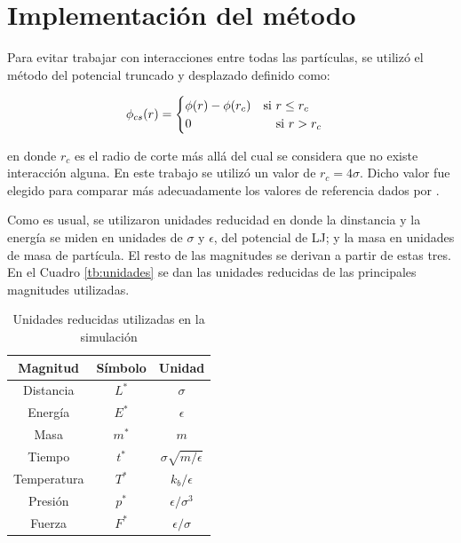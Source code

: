 \documentclass[a4paper,12pt]{article}
\begin{document}
\section{Implementación del método}

Para evitar trabajar con interacciones entre todas las partículas, se utilizó 
el método del potencial truncado y desplazado definido como:

\begin{equation}\label{eq:pot_cs}
  \phi_{cs}(r) = 
  \begin{cases}
	  \phi(r)- \phi(r_c) \quad \text{si } r \leq r_c \\
	  0 \hspace{2.4cm} \text{si } r > r_c
  \end{cases}
\end{equation}

\noindent en donde $r_c$ es el radio de corte más allá del cual se considera 
que no existe interacción alguna. En este trabajo se utilizó un valor de 
$r_c=4\sigma$. Dicho valor fue elegido para comparar más adecuadamente los 
valores de referencia dados por \cite{johnson1993}.

Como es usual, se utilizaron unidades reducidad en donde la dinstancia y la 
energía se miden en unidades de $\sigma$ y $\epsilon$, del potencial de LJ; y 
la masa en unidades de masa de partícula. El resto de las magnitudes se 
derivan a partir de estas tres. En el Cuadro \eqref{tb:unidades} se dan las 
unidades reducidas de las principales magnitudes utilizadas.

\begin{table}
	\begin{center}
		\begin{tabular}{ccc}
			\hline
			{\bf Magnitud} & {\bf Símbolo} & {\bf Unidad} \\ \hline
			Distancia   & $L^*$ & $\sigma$ \\ 
			Energía     & $E^*$ & $\epsilon$ \\ 
			Masa        & $m^*$ & $m$ \\ 
			Tiempo      & $t^*$ & $\sigma\sqrt{m/\epsilon}$ \\ 
			Temperatura & $T^*$ & $k_b/\epsilon$ \\ 
			Presión     & $p^*$ & $\epsilon/\sigma^3$ \\ 
			Fuerza      & $F^*$ & $\epsilon/\sigma$ \\ 
			\hline 
		\end{tabular}
	\end{center} 
	\caption{Unidades reducidas utilizadas en la simulación}
	\label{tb:unidades}
\end{table}
\end{document}
